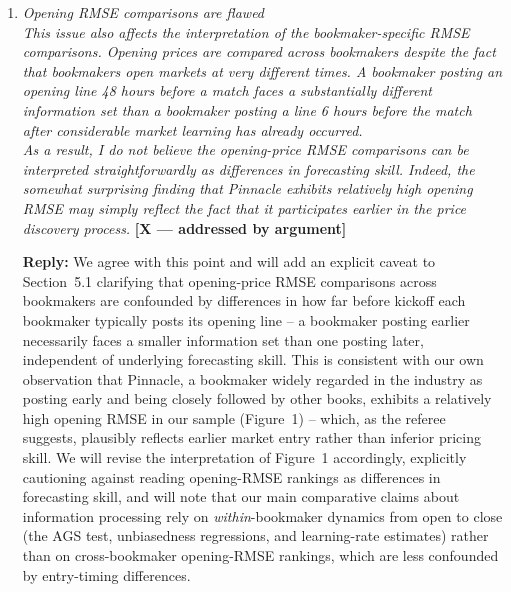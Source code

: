 \documentclass[letterpaper,12pt]{article}
\newcounter{b}
\newcommand{\argX}{\textcolor{green!55!black}{\textbf{[X --- addressed by argument]}}}
\newcommand{\Reply}[1]{\par\noindent\textbf{Reply:} #1}
\begin{document}
\begin{enumerate}
{Regarding institutional detail, we agree that the paper currently treats bookmakers as largely symmetric information processors. We will add discussion in Sections~2 and~6 acknowledging the institutional asymmetries the referee raises -- e.g., sharp bookmakers such as Pinnacle opening earlier and operating with lower initial limits, with other books adjusting in response -- citing the relevant industry and academic literature on price leadership among bookmakers, and will explicitly flag the study of lead-lag relationships across bookmakers (raised again in Comment~6 below) as an important direction for future work that our dataset could support.}


\item \textit{Opening RMSE comparisons are flawed\\[6pt]
This issue also affects the interpretation of the bookmaker-specific RMSE comparisons.
Opening prices are compared across bookmakers despite the fact that bookmakers open
markets at very different times. A bookmaker posting an opening line 48 hours before a
match faces a substantially different information set than a bookmaker posting a line 6
hours before the match after considerable market learning has already occurred.\\[6pt]
As a result, I do not believe the opening-price RMSE comparisons can be interpreted
straightforwardly as differences in forecasting skill. Indeed, the somewhat surprising
finding that Pinnacle exhibits relatively high opening RMSE may simply reflect the fact
that it participates earlier in the price discovery process. } \argX

\Reply{We agree with this point and will add an explicit caveat to Section~5.1 clarifying that opening-price RMSE comparisons across bookmakers are confounded by differences in how far before kickoff each bookmaker typically posts its opening line -- a bookmaker posting earlier necessarily faces a smaller information set than one posting later, independent of underlying forecasting skill. This is consistent with our own observation that Pinnacle, a bookmaker widely regarded in the industry as posting early and being closely followed by other books, exhibits a relatively high opening RMSE in our sample (Figure~1) -- which, as the referee suggests, plausibly reflects earlier market entry rather than inferior pricing skill. We will revise the interpretation of Figure~1 accordingly, explicitly cautioning against reading opening-RMSE rankings as differences in forecasting skill, and will note that our main comparative claims about information processing rely on \emph{within}-bookmaker dynamics from open to close (the AGS test, unbiasedness regressions, and learning-rate estimates) rather than on cross-bookmaker opening-RMSE rankings, which are less confounded by entry-timing differences.}


\end{enumerate}
\end{document}
